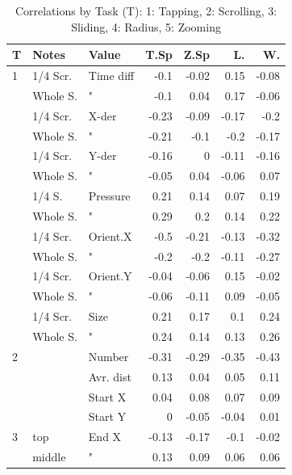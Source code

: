 \documentclass{sigchi}
\begin{document}
\begin{table}[ht]
		\caption{Correlations by Task (T): 1: Tapping, 2: Scrolling, 3: Sliding, 4: Radius, 5: Zooming }
		\label{allCorrelations}
    \begin{tabular}{|lll|rrrr|}
    \hline
    T 	& Notes       & Value     & T.Sp  & Z.Sp   & L. & W. \\ \hline
    1    & 1/4 Scr.  	& Time diff & -0.1  & -0.02  & 0.15   & -0.08 \\
    ~    & Whole S.   & "         & -0.1  & 0.04   & 0.17   & -0.06 \\
    ~    & 1/4 Scr.  	& X-der     & -0.23 & -0.09  & -0.17  & -0.2  \\
    ~    & Whole S.   & "         & -0.21 & -0.1   & -0.2   & -0.17 \\
    ~    & 1/4 Scr.  	&  Y-der    & -0.16 & 0      & -0.11  & -0.16 \\
    ~    & Whole S.   & "         & -0.05 & 0.04   & -0.06  & 0.07  \\
    ~    & 1/4 S.  		& Pressure  & 0.21  & 0.14   & 0.07   & 0.19  \\
    ~    & Whole S.   & "         & 0.29  & 0.2    & 0.14   & 0.22  \\
    ~    & 1/4 Scr.  	& Orient.X  & -0.5  & -0.21  & -0.13  & -0.32 \\
    ~    & Whole S.   & "         & -0.2  & -0.2   & -0.11  & -0.27 \\
    ~    & 1/4 Scr.  	& Orient.Y  & -0.04 & -0.06  & 0.15   & -0.02 \\
    ~    & Whole S.   & "         & -0.06 & -0.11  & 0.09   & -0.05 \\
    ~    & 1/4 Scr.  	& Size      & 0.21  & 0.17   & 0.1    & 0.24  \\
    ~    & Whole S.   & "         & 0.24  & 0.14   & 0.13   & 0.26  \\ \hline
    2    & ~          & Number    & -0.31 & -0.29  & -0.35  & \cellcolor[gray]{0.9}-0.43 \\
    ~    & ~          & Avr. dist & 0.13  & 0.04   & 0.05   & 0.11  \\
    ~    & ~          & Start X   & 0.04  & 0.08   & 0.07   & 0.09  \\
    ~    & ~          & Start Y   & 0     & -0.05  & -0.04  & 0.01  \\ \hline
    3    & top  			& End X     & -0.13 & -0.17  & -0.1   & -0.02 \\
    ~    & middle  		& "         & 0.13  & 0.09   & 0.06   & 0.06  \\

\end{tabular}
\end{table}
\end{document}
